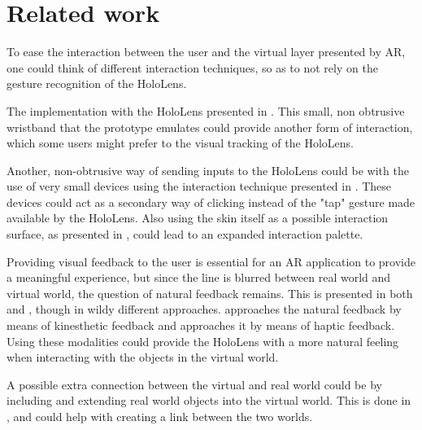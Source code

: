 
\section{Related work}
To ease the interaction between the user and the virtual layer presented by AR, one could think of different interaction techniques, so as to not rely on the gesture recognition of the HoloLens.\par
The implementation with the HoloLens presented in \cite{watchsense}. This small, non obtrusive wristband that the prototype emulates could provide another form of interaction, which some users might prefer to the visual tracking of the HoloLens.\par
Another, non-obtrusive way of sending inputs to the HoloLens could be with the use of very small devices using the interaction technique presented in \cite{back}. These devices could act as a secondary way of clicking instead of the "tap" gesture made available by the HoloLens. Also using the skin itself as a possible interaction surface, as presented in \cite{skin}, could lead to an expanded interaction palette.\par
Providing visual feedback to the user is essential for an AR application to  provide a meaningful experience, but since the line is blurred between real world and virtual world, the question of natural feedback remains. This is presented in both \cite{stroem} and \cite{finger}, though in wildy different approaches. \cite{stroem} approaches the natural feedback by means of kinesthetic feedback and \cite{finger} approaches it by means of haptic feedback. Using these modalities could provide the HoloLens with a more natural feeling when interacting with the objects in the virtual world.\par
A possible extra connection between the virtual and real world could be by including and extending real world objects into the virtual world. This is done in \cite{multifi}, and could help with creating a link between the two worlds. 
